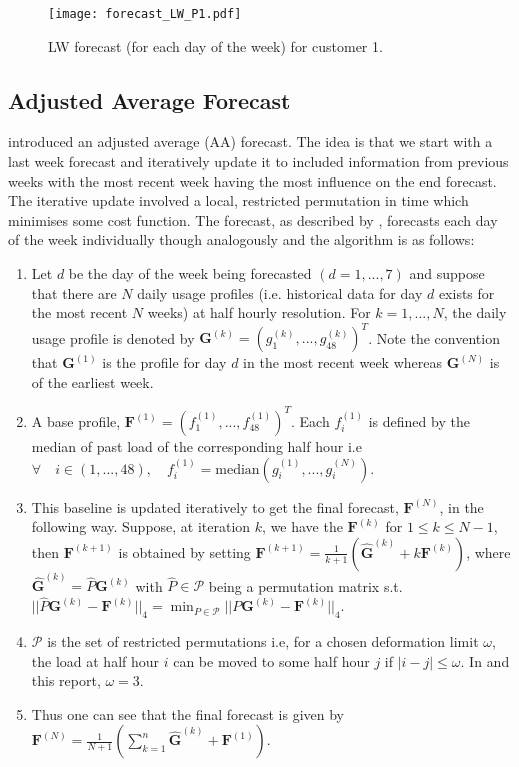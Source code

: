 \begin{figure}
\texttt{[image: forecast\_LW\_P1.pdf]}
\caption{LW forecast (for each day of the week) for customer 1.}
\label{fig:LW_forecast_P1} 
\end{figure}

\subsection{Adjusted Average Forecast}

\cite{dan14} introduced an adjusted average (AA) forecast. The idea is that we start with a last week forecast and iteratively update it to included information from previous weeks with the most recent week having the most influence on the end forecast. The iterative update involved a local, restricted permutation in time which minimises some cost function. The forecast, as described by \cite{dan14}, forecasts each day of the week individually though analogously and the algorithm is as follows:
\begin{enumerate}[label=\roman*)]
\item Let $d$ be the day of the week being forecasted $(d=1,...,7)$ and suppose that there are $N$ daily usage profiles (i.e. historical data for day $d$ exists for the most recent $N$ weeks) at half hourly resolution. For $k = 1, ..., N$, the daily usage profile is denoted by $\boldsymbol{G}^{(k)} = (g_1^{(k)}, ... , g_{48}^{(k)})^T$. Note the convention that $\boldsymbol{G}^{(1)}$ is the profile for day $d$ in the most recent week whereas $\boldsymbol{G}^{(N)}$ is of the earliest week.
\item A base profile, $\boldsymbol{F}^{(1)} = \left(f_1^{(1)}, ... , f_{48}^{(1)} \right)^T$. Each $f_i^{(1)}$ is defined by the median of past load of the corresponding half hour i.e $ \forall \quad i \in (1, ..., 48), \quad f_i^{(1)} = \text{median}(g_i^{(1)}, ..., g_i^{(N)})$.
\item This baseline is updated iteratively to get the final forecast, $\boldsymbol{F}^{(N)}$, in the following way. Suppose, at iteration $k$, we have the $\boldsymbol{F}^{(k)}$ for $1 \le k \le N-1$, then $\boldsymbol{F}^{(k+1)}$ is obtained by setting $\boldsymbol{F}^{(k+1)} = \frac{1}{k+1} \left( \boldsymbol{\hat{G}}^{(k)} + k \boldsymbol{F}^{(k)}\right)$, where $\boldsymbol{\hat{G}}^{(k)} = \hat{P}\boldsymbol{G}^{(k)}$ with $\hat{P} \in  \mathscr{P}$ being a permutation matrix s.t. $||\hat{P}\boldsymbol{G}^{(k)} - \boldsymbol{F}^{(k)}||_4 = \displaystyle \min_{P \in \mathscr{P}}||P\boldsymbol{G}^{(k)} - \boldsymbol{F}^{(k)}||_4 $.
\item $\mathscr{P}$ is the set of restricted permutations i.e, for a chosen deformation limit $\omega$, the load at half hour $i$ can be moved to some half hour $j$ if $|i-j| \le \omega$. In \cite{dan14} and this report, $\omega=3$.
\item Thus one can see that the final forecast is given by $\boldsymbol{F}^{(N)} = \frac{1}{N+1}\left(\displaystyle \sum_{k=1}^n \boldsymbol{\hat{G}}^{(k)} + \boldsymbol{F}^{(1)} \right)$.
\end{enumerate}

